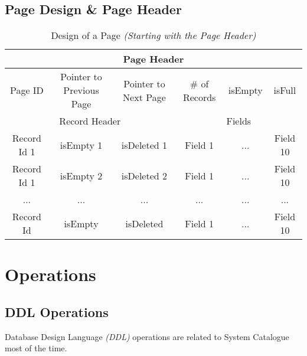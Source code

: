\documentclass{article}
\newcounter{late}
\begin{document}
    \subsection{Page Design \& Page Header}
                \begin{table}[h!]
                \begin{center}
                \begin{tabular}{ | c | c | c | c | c | c |}
                \hline
                    \multicolumn{6}{|c|}{Page Header} \\
                \hline
                \hline
                    \multicolumn{1}{|c|}{Page ID} &
                    \multicolumn{1}{|c|}{Pointer to Previous Page} &
                    \multicolumn{1}{|c|}{Pointer to Next Page} &
                    \multicolumn{1}{|c|}{\# of Records} &
                    \multicolumn{1}{|c|}{isEmpty} &
                    \multicolumn{1}{|c|}{isFull} \\
                \hline
                \hline
                    \multicolumn{3}{|c|}{Record Header} &
                    \multicolumn{3}{|c|}{Fields} \\
                \hline
                \hline
                Record Id 1 & isEmpty 1 & isDeleted 1 & Field 1  & ... & Field 10 \\
                \hline
                Record Id 1 & isEmpty 2 & isDeleted 2 & Field 1 & ... & Field 10 \\
                \hline
                ...  & ... & ... & ... & ...  & ...  \\
                \hline
                Record Id  & isEmpty  & isDeleted  & Field 1  & ... & Field 10 \\
                \hline
                \end{tabular}
            \end{center}
    \caption{Design of a Page \emph{(Starting with the Page Header)}}
    \label{table:1}
    \end{table}
    
\newpage
\section{Operations}
    \subsection{DDL Operations}
        Database Design Language \emph{(DDL)} operations are related to System Catalogue most of the time.
\end{document}
